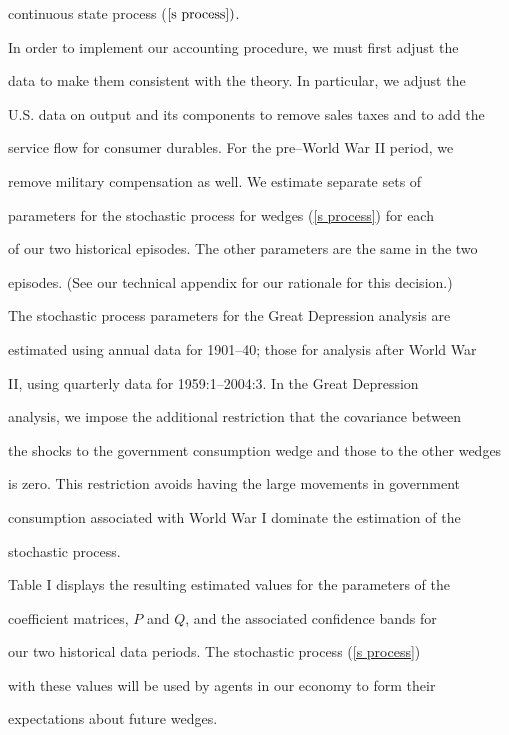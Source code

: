 \documentclass[fleqn,leqno,11pt]{article}
\begin{document}
continuous state process ($\ref{s process})$.



In order to implement our accounting procedure, we must first adjust the

data to make them consistent with the theory. In particular, we adjust the

U.S. data on output and its components to remove sales taxes and to add the

service flow for consumer durables. For the pre--World War II period, we

remove military compensation as well. We estimate separate sets of

parameters for the stochastic process for wedges (\ref{s process}) for each

of our two historical episodes. The other parameters are the same in the two

episodes. (See our technical appendix for our rationale for this decision.)

The stochastic process parameters for the Great Depression analysis are

estimated using annual data for 1901--40; those for analysis after World War

II, using quarterly data for 1959:1--2004:3. In the Great Depression

analysis, we impose the additional restriction that the covariance between

the shocks to the government consumption wedge and those to the other wedges

is zero. This restriction avoids having the large movements in government

consumption associated with World War I dominate the estimation of the

stochastic process.



Table I displays the resulting estimated values for the parameters of the

coefficient matrices, $P$ and $Q$, and the associated confidence bands for

our two historical data periods. The stochastic process (\ref{s process})

with these values will be used by agents in our economy to form their

expectations about future wedges.



\bigskip
\end{document}
